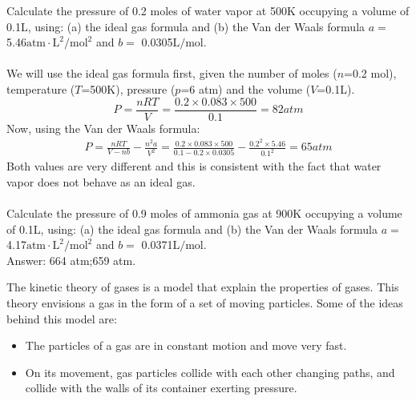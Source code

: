 \documentclass[main.tex]{subfiles}
\begin{document}
\begin{description}
\begin{example} %
Calculate the pressure of 0.2 moles of water vapor at 500K occupying a volume of 0.1L, using: (a) the ideal gas formula and (b) the Van der Waals formula $a=$ 5.46$\text{atm}\cdot \text{L}^2/\text{mol}^{2}$ and $b=$ 0.0305$\text{L}/\text{mol}$.\\
\\
We will use the ideal gas formula first, given the number of moles ($n$=0.2 mol), temperature ($T$=500K), pressure ($p$=6 atm) and the volume ($V$=0.1L).
\begin{equation*}
P=\frac{nRT}{V}=\frac{0.2\times 0.083\times 500}{0.1}=82atm   
\end{equation*}
Now, using the Van der Waals formula:
\begin{equation*}\begin{split}
P=\frac{nRT}{V-nb}-\frac{n^2a}{V^2}= \frac{0.2\times 0.083\times 500}{0.1-0.2\times 0.0305}-\frac{0.2^2\times 5.46}{0.1^2}=65atm 
\end{split}\end{equation*}
Both values are very different and this is consistent with the fact that water vapor does not behave as an ideal gas.
\\
\faDiamond\ \\
Calculate the pressure of 0.9 moles of ammonia gas at 900K occupying a volume of 0.1L, using: (a) the ideal gas formula and (b) the Van der Waals formula $a=$ 4.17$\text{atm}\cdot \text{L}^2/\text{mol}^{2}$ and $b=$ 0.0371$\text{L}/\text{mol}$.\\
\flushright Answer: 664 atm;659 atm.
\end{example}%
\item[\docfilehook{Kinetic theory of gases}{Kinetic theory of gases}] 
The kinetic theory of gases is a model that explain the properties of gases. This theory envisions a gas in the form of a set of moving particles. Some of the ideas behind this model are: 
\begin{itemize}
\item  The particles of a gas are in constant motion and move very fast.
\item On its movement, gas particles collide with each other changing paths, and collide with the walls of its container exerting pressure.

\end{itemize}
\end{description}
\end{document}
